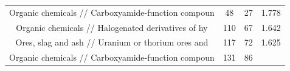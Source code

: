 \documentclass[10pt,]{article}
\begin{document}
\begin{longtable}[]{@{}cccc@{}}
\begin{minipage}[t]{0.38\columnwidth}
Organic chemicals // Carboxyamide-function compoun\strut
\end{minipage} & \begin{minipage}[t]{0.21\columnwidth}\centering\strut
48\strut
\end{minipage} & \begin{minipage}[t]{0.20\columnwidth}\centering\strut
27\strut
\end{minipage} & \begin{minipage}[t]{0.09\columnwidth}\centering\strut
1.778\strut
\end{minipage}\tabularnewline
\begin{minipage}[t]{0.38\columnwidth}\centering\strut
Organic chemicals // Halogenated derivatives of hy\strut
\end{minipage} & \begin{minipage}[t]{0.21\columnwidth}\centering\strut
110\strut
\end{minipage} & \begin{minipage}[t]{0.20\columnwidth}\centering\strut
67\strut
\end{minipage} & \begin{minipage}[t]{0.09\columnwidth}\centering\strut
1.642\strut
\end{minipage}\tabularnewline
\begin{minipage}[t]{0.38\columnwidth}\centering\strut
Ores, slag and ash // Uranium or thorium ores and\strut
\end{minipage} & \begin{minipage}[t]{0.21\columnwidth}\centering\strut
117\strut
\end{minipage} & \begin{minipage}[t]{0.20\columnwidth}\centering\strut
72\strut
\end{minipage} & \begin{minipage}[t]{0.09\columnwidth}\centering\strut
1.625\strut
\end{minipage}\tabularnewline
\begin{minipage}[t]{0.38\columnwidth}\centering\strut
Organic chemicals // Carboxyamide-function compoun\strut
\end{minipage} & \begin{minipage}[t]{0.21\columnwidth}\centering\strut
131\strut
\end{minipage} & \begin{minipage}[t]{0.20\columnwidth}\centering\strut
86\strut
\end{minipage} & \begin{minipage}[t]{0.09\columnwidth}\centering\strut

\end{minipage}
\end{longtable}
\end{document}
